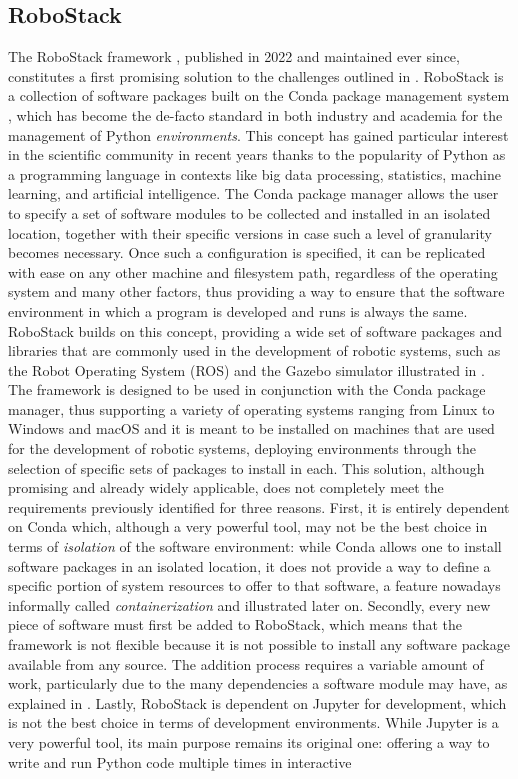 \subsection{RoboStack}
\label{sec:related_work_robostack}
The RoboStack framework \cite{fischer_robostack_2022}, published in 2022 and maintained ever since, constitutes a first promising solution to the challenges outlined in . RoboStack is a collection of software packages built on the Conda package management system \cite{anaconda_inc_conda_nodate}, which has become the de-facto standard in both industry and academia for the management of Python \emph{environments}. This concept has gained particular interest in the scientific community in recent years thanks to the popularity of Python as a programming language in contexts like big data processing, statistics, machine learning, and artificial intelligence. The Conda package manager allows the user to specify a set of software modules to be collected and installed in an isolated location, together with their specific versions in case such a level of granularity becomes necessary. Once such a configuration is specified, it can be replicated with ease on any other machine and filesystem path, regardless of the operating system and many other factors, thus providing a way to ensure that the software environment in which a program is developed and runs is always the same. RoboStack builds on this concept, providing a wide set of software packages and libraries that are commonly used in the development of robotic systems, such as the Robot Operating System (ROS) and the Gazebo simulator illustrated in . The framework is designed to be used in conjunction with the Conda package manager, thus supporting a variety of operating systems ranging from Linux to Windows and macOS and it is meant to be installed on machines that are used for the development of robotic systems, deploying environments through the selection of specific sets of packages to install in each. This solution, although promising and already widely applicable, does not completely meet the requirements previously identified for three reasons. First, it is entirely dependent on Conda which, although a very powerful tool, may not be the best choice in terms of \emph{isolation} of the software environment: while Conda allows one to install software packages in an isolated location, it does not provide a way to define a specific portion of system resources to offer to that software, a feature nowadays informally called \emph{containerization} and illustrated later on. Secondly, every new piece of software must first be added to RoboStack, which means that the framework is not flexible because it is not possible to install any software package available from any source. The addition process requires a variable amount of work, particularly due to the many dependencies a software module may have, as explained in \cite{fischer_robostack_2022}. Lastly, RoboStack is dependent on Jupyter for development, which is not the best choice in terms of development environments. While Jupyter is a very powerful tool, its main purpose remains its original one: offering a way to write and run Python code multiple times in interactive 